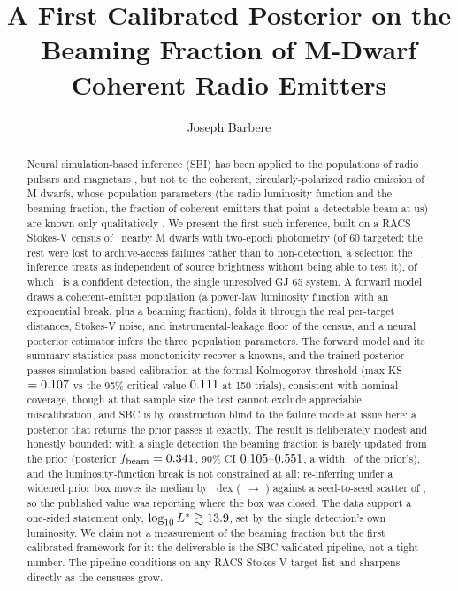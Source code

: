 \documentclass[twocolumn]{aastex631}
\begin{document}
\title{A First Calibrated Posterior on the Beaming Fraction of M-Dwarf Coherent Radio
Emitters}
\author[0009-0008-3289-4447]{Joseph Barbere}

\begin{abstract}
Neural simulation-based inference (SBI) has been applied to the populations of radio pulsars
\citep{graber2024,pardoaraujo2024} and magnetars \citep{sautron2025}, but not to the coherent,
circularly-polarized radio emission of M dwarfs, whose population parameters (the radio
luminosity function and the beaming fraction, the fraction of coherent emitters that point a
detectable beam at us) are known only qualitatively \citep{callingham2021,pritchard2021}. We
present the first such inference, built on a RACS Stokes-V census of \svbRealNTargets\ nearby M
dwarfs with two-epoch photometry (of 60 targeted; the rest were lost to archive-access failures
rather than to non-detection, a selection the inference treats as independent of source
brightness without being able to test it), of which \svbRealNDet\ is a confident detection, the
single unresolved GJ 65 system. A forward model draws a coherent-emitter population (a power-law
luminosity function with an exponential break, plus a beaming fraction), folds it through the
real per-target distances, Stokes-V noise, and instrumental-leakage floor of the census, and a
neural posterior estimator \citep{papamakarios2016,sbi_toolkit} infers the three population
parameters. The forward model and its summary statistics pass monotonicity recover-a-knowns, and
the trained posterior passes simulation-based calibration \citep[SBC;][]{talts2018} at the formal
Kolmogorov threshold (max KS $= 0.107$ vs the 95\% critical value $0.111$ at 150
trials), consistent with nominal coverage, though at that sample size the test cannot
exclude appreciable miscalibration, and SBC is by construction blind to the failure mode at issue here:
a posterior that returns the prior passes it exactly. The result is deliberately modest and
honestly bounded: with a single detection the beaming
fraction is barely updated from the prior (posterior $f_{\rm beam} = 0.341$, 90\% CI
$0.105$--$0.551$, a width \svbRealFbeamWidthRatio\ of the prior's), and the
luminosity-function break is not constrained at all: re-inferring under a widened prior box moves
its median by \svbPriorLogLShift\ dex (\svbPriorLogLPub\ $\to$ \svbPriorLogLWide) against a
seed-to-seed scatter of \svbPriorLogLSeedSd, so the published value was reporting where the box
was closed. The data support a one-sided statement only, $\log_{10} L^* \gtrsim 13.9$,
set by the single detection's own luminosity. We claim not a measurement of the beaming fraction
but the first calibrated framework for it: the deliverable is the SBC-validated pipeline, not a
tight number. The pipeline conditions on any RACS Stokes-V target list and sharpens directly
as the censuses grow.
\end{abstract}
\end{document}
